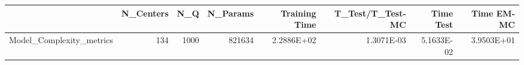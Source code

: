 \begin{tabular}{lrrrrrrr}
\toprule
{} &  N\_Centers &   N\_Q &  N\_Params &  Training Time &  T\_Test/T\_Test-MC &  Time Test &  Time EM-MC \\
\midrule
Model\_Complexity\_metrics &        134 &  1000 &    821634 &     2.2886E+02 &        1.3071E-03 & 5.1633E-02 &  3.9503E+01 \\
\bottomrule
\end{tabular}
